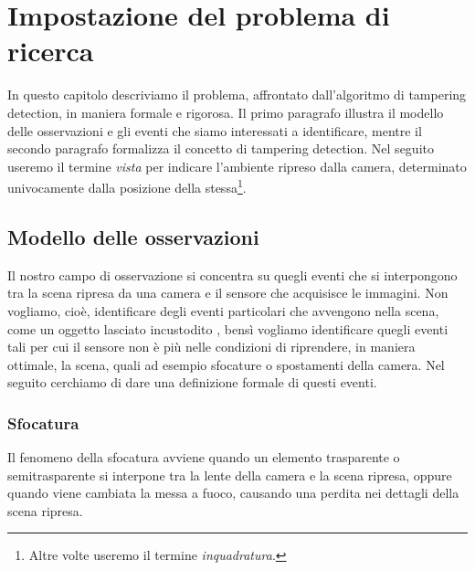 \chapter{Impostazione del problema di ricerca}
\label{FormulazioneProblema}
\thispagestyle{empty}

\vspace{0.5cm}
In questo capitolo descriviamo il problema, affrontato dall'algoritmo di tampering detection, in maniera formale e rigorosa. Il primo paragrafo illustra il modello delle osservazioni e gli eventi che siamo interessati a identificare, mentre il secondo paragrafo formalizza il concetto di tampering detection. Nel seguito useremo il termine \textit{vista} per indicare l'ambiente ripreso dalla camera, determinato univocamente dalla posizione della stessa\footnote{Altre volte useremo il termine \textit{inquadratura}.}.
\noindent 
\section{Modello delle osservazioni}
Il nostro campo di osservazione si concentra su quegli eventi che si interpongono tra la scena ripresa da una camera e il sensore che acquisisce le immagini. Non vogliamo, cio\`e, identificare degli eventi particolari che avvengono nella scena, come un oggetto lasciato incustodito \cite{Targhe}, bens\`i vogliamo identificare quegli eventi tali per cui il sensore non \`e pi\`u nelle condizioni di riprendere, in maniera ottimale, la scena, quali ad esempio sfocature o spostamenti della camera.
Nel seguito cerchiamo di dare una definizione formale di questi eventi.
\subsection{Sfocatura}
Il fenomeno della sfocatura avviene quando un elemento trasparente o semitrasparente si interpone tra la lente della camera e la scena ripresa, oppure quando viene cambiata la messa a fuoco, causando una perdita nei dettagli della scena ripresa.

